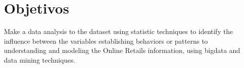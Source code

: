 \section{Objetivos}
 Make a data analysis to the dataset using statistic techniques to identify the influence between the variables establishing behaviors or patterns to understanding and modeling the Online Retails information, using bigdata and data mining techniques.